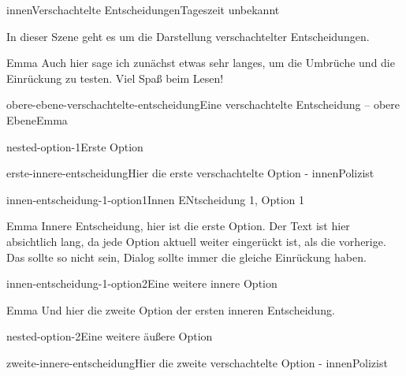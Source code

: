 \documentclass[12pt]{article}
\begin{document}
    \begin{scene}{innen}{Verschachtelte Entscheidungen}{Tageszeit unbekannt}
        \begin{scenedescription}
            In dieser Szene geht es um die Darstellung verschachtelter Entscheidungen.
        \end{scenedescription}

        \begin{dialog}{Emma}
            Auch hier sage ich zunächst etwas sehr langes, um die Umbrüche und die Einrückung zu testen.
            Viel Spaß beim Lesen!
        \end{dialog}

        \begin{decision}{obere-ebene-verschachtelte-entscheidung}{Eine verschachtelte Entscheidung -- obere Ebene}{Emma}
            \begin{option}{nested-option-1}{Erste Option}
                \begin{decision}{erste-innere-entscheidung}{Hier die erste verschachtelte Option - innen}{Polizist}
                    \begin{option}{innen-entscheidung-1-option1}{Innen ENtscheidung 1, Option 1}
                        \begin{dialog}{Emma}
                            Innere Entscheidung, hier ist die erste Option.
                            Der Text ist hier absichtlich lang, da jede Option aktuell weiter eingerückt ist, als die vorherige.
                            Das sollte so nicht sein, Dialog sollte immer die gleiche Einrückung haben.
                        \end{dialog}
                    \end{option}
                    \begin{option}{innen-entscheidung-1-option2}{Eine weitere innere Option}
                        \begin{dialog}{Emma}
                            Und hier die zweite Option der ersten inneren Entscheidung.
                        \end{dialog}
                    \end{option}
                \end{decision}
            \end{option}
            \begin{option}{nested-option-2}{Eine weitere äußere Option}
                \begin{decision}{zweite-innere-entscheidung}{Hier die zweite verschachtelte Option - innen}{Polizist}

\end{decision}
\end{option}
\end{decision}
\end{scene}
\end{document}
